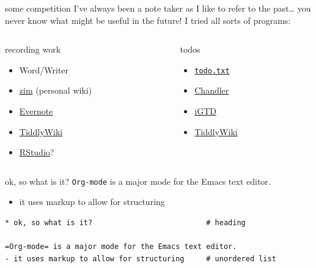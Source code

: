 \documentclass[aspectratio=169,presentation,bigger,fleqn,t]{beamer}
\begin{document}
\begin{frame}[fragile,label={sec:orgheadline4}]{some competition}
 I've always been a note taker as I like to refer to the past\ldots{} you never know what
might be useful in the future! I tried all sorts of programs:

\begin{columns}
\begin{column}{0.5\columnwidth}
\begin{block}{recording work}
\begin{itemize}
\item Word/Writer
\item \href{http://zim-wiki.org/}{zim} (personal wiki)
\item \href{https://evernote.com/}{Evernote}
\item \href{http://tiddlywiki.com/}{TiddlyWiki}
\item \href{https://www.rstudio.com/}{RStudio}?
\end{itemize}
\end{block}
\end{column}


\begin{column}{0.5\columnwidth}
\begin{block}{todos}
\begin{itemize}
\item \href{http://todotxt.com/}{\texttt{todo.txt}}
\item \href{https://en.wikipedia.org/wiki/Chandler_(software)}{Chandler}
\item \href{https://itunes.apple.com/us/app/igtd/id488595283?mt=8}{iGTD}
\item \href{http://tiddlywiki.com/}{TiddlyWiki}
\end{itemize}
\end{block}
\end{column}
\end{columns}
\end{frame}

\begin{frame}[fragile,label={sec:orgheadline5}]{ok, so what is it?}
 \texttt{Org-mode} is a major mode for the Emacs text editor.
\begin{itemize}
\item it uses markup to allow for structuring
\end{itemize}

\begin{verbatim}
* ok, so what is it?                          # heading

=Org-mode= is a major mode for the Emacs text editor.
- it uses markup to allow for structuring     # unordered list
\end{verbatim}
\end{frame}
\end{document}
